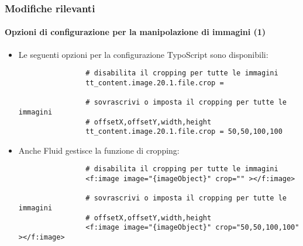 \begin{frame}[fragile]
	\frametitle{Modifiche rilevanti}
	\framesubtitle{Opzioni di configurazione per la manipolazione di immagini (1)}

	\begin{itemize}
		\item Le seguenti opzioni per la configurazione TypoScript sono disponibili:
			\begin{lstlisting}
				# disabilita il cropping per tutte le immagini
				tt_content.image.20.1.file.crop =

				# sovrascrivi o imposta il cropping per tutte le immagini
				# offsetX,offsetY,width,height
				tt_content.image.20.1.file.crop = 50,50,100,100
			\end{lstlisting}

		\item Anche Fluid gestisce la funzione di cropping:
			\begin{lstlisting}
				# disabilita il cropping per tutte le immagini
				<f:image image="{imageObject}" crop="" ></f:image>

				# sovrascrivi o imposta il cropping per tutte le immagini
				# offsetX,offsetY,width,height
				<f:image image="{imageObject}" crop="50,50,100,100" ></f:image>
			\end{lstlisting}

	\end{itemize}

\end{frame}

